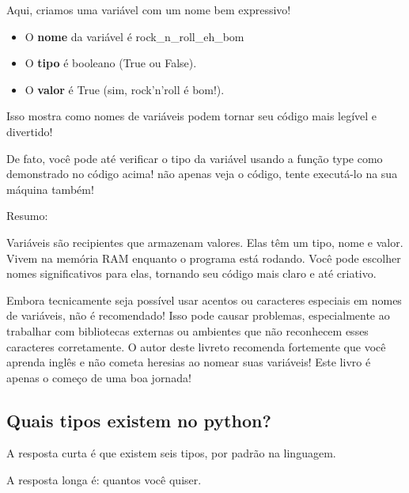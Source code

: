 \documentclass[12pt]{book}
\begin{document}
	
	Aqui, criamos uma variável com um nome bem expressivo!
	
	\begin{itemize}
		\item O \textbf{nome} da variável é rock\_n\_roll\_eh\_bom
		\item O \textbf{tipo} é booleano (True ou False).
		\item O \textbf{valor} é True (sim, rock'n'roll é bom!).
	\end{itemize}
	
	Isso mostra como nomes de variáveis podem tornar seu código mais legível e divertido!
	
	De fato, você pode até verificar o tipo da variável usando a função type\(\) como demonstrado no código acima! não apenas veja o código, tente executá-lo na sua máquina também!
	
	Resumo:
	
	Variáveis são recipientes que armazenam valores.
	Elas têm um tipo, nome e valor. Vivem na memória RAM enquanto o programa está rodando.
	Você pode escolher nomes significativos para elas, tornando seu código mais claro e até criativo.
	
	\begin{tcolorbox}[colback=gray!10, colframe=black, title={\large\bfseries Observação}]
		Embora tecnicamente seja possível usar acentos ou caracteres especiais em nomes de variáveis, não é recomendado! Isso pode causar problemas, especialmente ao trabalhar com bibliotecas externas ou ambientes que não reconhecem esses caracteres corretamente. O autor deste livreto recomenda fortemente que você aprenda inglês e não cometa heresias ao nomear suas variáveis! Este livro é apenas o começo de uma boa jornada!
	\end{tcolorbox}
	
	\subsection{Quais tipos existem no python?}
	
	A resposta curta é que existem seis tipos, por padrão na linguagem.
	
	A resposta longa é: quantos você quiser.
	
\end{document}
